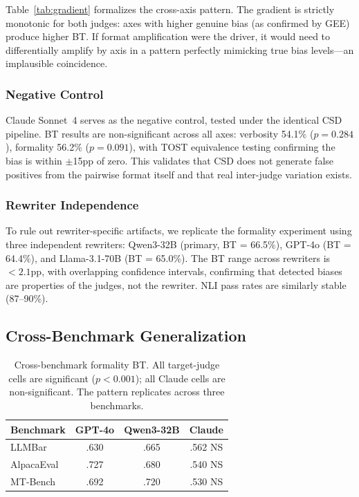\documentclass[11pt]{article}
\begin{document}
Table~\ref{tab:gradient} formalizes the cross-axis pattern.
The gradient is strictly monotonic for both judges: axes with higher genuine bias (as confirmed by GEE) produce higher BT.
If format amplification were the driver, it would need to differentially amplify by axis in a pattern perfectly mimicking true bias levels---an implausible coincidence.

\subsubsection{Negative Control}
\label{sec:negative_control}

Claude Sonnet~4 serves as the negative control, tested under the identical CSD pipeline.
BT results are non-significant across all axes: verbosity 54.1\% ($p = 0.284$), formality 56.2\% ($p = 0.091$), with TOST equivalence testing confirming the bias is within $\pm$15pp of zero.
This validates that CSD does not generate false positives from the pairwise format itself and that real inter-judge variation exists.

\subsubsection{Rewriter Independence}
\label{sec:rewriter}

To rule out rewriter-specific artifacts, we replicate the formality experiment using three independent rewriters: Qwen3-32B (primary, BT = 66.5\%), GPT-4o (BT = 64.4\%), and Llama-3.1-70B (BT = 65.0\%).
The BT range across rewriters is $< 2.1$pp, with overlapping confidence intervals, confirming that detected biases are properties of the judges, not the rewriter.
NLI pass rates are similarly stable (87--90\%).

\subsection{Cross-Benchmark Generalization}
\label{sec:cross_benchmark}

\begin{table}[t]
\centering
\small
\begin{tabular}{lccc}
\toprule
\textbf{Benchmark} & \textbf{GPT-4o} & \textbf{Qwen3-32B} & \textbf{Claude} \\
\midrule
LLMBar    & .630 & .665 & .562 NS \\
AlpacaEval & .727 & .680 & .540 NS \\
MT-Bench  & .692 & .720 & .530 NS \\
\bottomrule
\end{tabular}
\caption{Cross-benchmark formality BT. All target-judge cells are significant ($p < 0.001$); all Claude cells are non-significant. The pattern replicates across three benchmarks.}
\label{tab:cross_bench}
\end{table}
\end{document}
